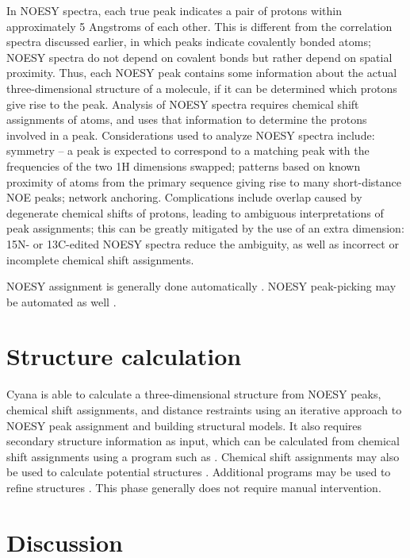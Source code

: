 In NOESY spectra, each true peak indicates a pair of protons within 
approximately 5 Angstroms of each other.  This is different from the 
correlation spectra discussed earlier, in which peaks indicate covalently 
bonded atoms; NOESY spectra do not depend on covalent bonds but rather 
depend on spatial proximity.  Thus, each NOESY peak contains some information 
about the actual three-dimensional structure of a molecule, if it can be 
determined which protons give rise to the peak.  Analysis of NOESY spectra 
requires chemical shift assignments of atoms, and uses that information to 
determine the protons involved in a peak.  Considerations used to analyze 
NOESY spectra include: symmetry -- a peak is expected to correspond to a 
matching peak with the frequencies of the two 1H dimensions swapped; patterns 
based on known proximity of atoms from the primary sequence giving rise to 
many short-distance NOE peaks; network anchoring.  Complications include 
overlap caused by degenerate chemical shifts of protons, leading to 
ambiguous interpretations of peak assignments; this can be greatly mitigated 
by the use of an extra dimension:  15N- or 13C-edited NOESY spectra reduce 
the ambiguity, as well as incorrect or incomplete chemical shift assignments.

NOESY assignment is generally done automatically \cite{cyana2004, aria2003}.  
NOESY peak-picking may be automated as well \cite{munin, korzhnev2001munin}.


\section{Structure calculation}

Cyana is able to calculate a three-dimensional structure from NOESY peaks, 
chemical shift assignments, and distance restraints \cite{cyana2004, aria2003} 
using an iterative approach to NOESY peak assignment and building structural 
models.  It also requires secondary structure information as input, which can 
be calculated from chemical shift assignments using a program such as 
\cite{talos+}.  Chemical shift assignments may also be used to 
calculate potential structures \cite{cs-rosetta}.  Additional programs 
may be used to refine structures \cite{amber, xplor-nih}.  This phase 
generally does not require manual intervention.


\section{Discussion}

